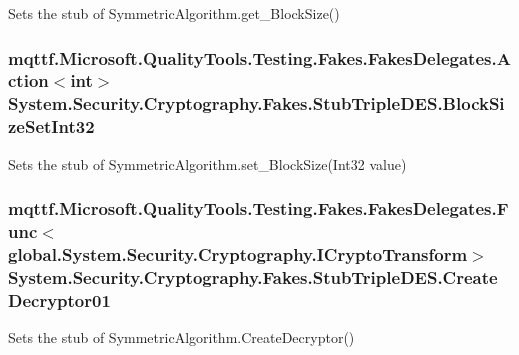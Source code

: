 Sets the stub of Symmetric\-Algorithm.\-get\-\_\-\-Block\-Size()

\hypertarget{class_system_1_1_security_1_1_cryptography_1_1_fakes_1_1_stub_triple_d_e_s_a14ffce7d8432848efa8ce755d72bfd5c}{
\subsubsection[{Block\-Size\-Set\-Int32}]{\setlength{\rightskip}{0pt plus 5cm}mqttf.\-Microsoft.\-Quality\-Tools.\-Testing.\-Fakes.\-Fakes\-Delegates.\-Action$<$int$>$ System.\-Security.\-Cryptography.\-Fakes.\-Stub\-Triple\-D\-E\-S.\-Block\-Size\-Set\-Int32}}\label{class_system_1_1_security_1_1_cryptography_1_1_fakes_1_1_stub_triple_d_e_s_a14ffce7d8432848efa8ce755d72bfd5c}


Sets the stub of Symmetric\-Algorithm.\-set\-\_\-\-Block\-Size(\-Int32 value)

\hypertarget{class_system_1_1_security_1_1_cryptography_1_1_fakes_1_1_stub_triple_d_e_s_a9d65bcaa4b1cfdd0f122b49614839058}{
\subsubsection[{Create\-Decryptor01}]{\setlength{\rightskip}{0pt plus 5cm}mqttf.\-Microsoft.\-Quality\-Tools.\-Testing.\-Fakes.\-Fakes\-Delegates.\-Func$<$global.\-System.\-Security.\-Cryptography.\-I\-Crypto\-Transform$>$ System.\-Security.\-Cryptography.\-Fakes.\-Stub\-Triple\-D\-E\-S.\-Create\-Decryptor01}}\label{class_system_1_1_security_1_1_cryptography_1_1_fakes_1_1_stub_triple_d_e_s_a9d65bcaa4b1cfdd0f122b49614839058}


Sets the stub of Symmetric\-Algorithm.\-Create\-Decryptor()

